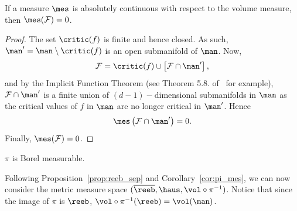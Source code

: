 \begin{lemma}\label{lem:zero_measure}
If a measure $\mes$ is absolutely continuous with respect to the volume measure, then $\mes(\mathcal{F})=0$.
\end{lemma}
\begin{proof}
The set $\critic(f)$ is finite and hence closed. As such, $\man'=\man\setminus\critic(f)$ is an open submanifold of $\man$. Now,
$$\mathcal{F}=\critic(f)\cup \left[\mathcal{F}\cap \man'\right],$$
and by the Implicit Function Theorem (see Theorem 5.8. of~\cite{boothby1986introduction} for example), $\mathcal{F}\cap \man'$ is a finite union of $(d-1)-$dimensional submanifolds in $\man$ as the critical values of $f$ in $\man$ are no longer critical in $\man'$. Hence
$$\mes\left( \mathcal{F}\cap \man'\right)=0.$$
Finally, $\mes(\mathcal{F})=0$.
\end{proof}


\begin{corollary}\label{cor:pi_mes}
$\pi$ is Borel measurable.
\end{corollary}

Following Proposition~\ref{prop:reeb_sep} and Corollary~\ref{cor:pi_mes}, we can now consider the metric measure space $(\overline{\reeb},\haus,\vol\circ\pi^{-1})$. Notice that since the image of $\pi$ is $\reeb$, $\vol\circ\pi^{-1}(\reeb)=\vol(\man)$.

